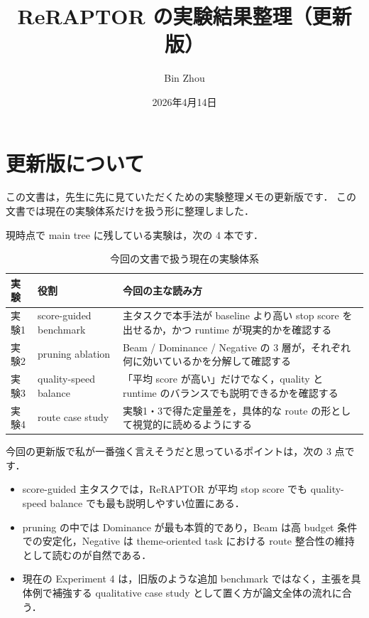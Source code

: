 \documentclass[a4paper,11pt]{article}
\newcommand{\reraptor}{ReRAPTOR}
\begin{document}
\sloppy

\title{ReRAPTOR の実験結果整理（更新版）}
\author{Bin Zhou}
\date{2026年4月14日}
\maketitle

\tableofcontents

\section{更新版について}
この文書は，先生に先に見ていただくための実験整理メモの更新版です．
この文書では現在の実験体系だけを扱う形に整理しました．

現時点で main tree に残している実験は，次の 4 本です．

\begin{table}[H]
    \centering
    \small
    \caption{今回の文書で扱う現在の実験体系}
    \begin{tabularx}{\linewidth}{L{1.4cm}L{4.0cm}X}
        \toprule
        実験 & 役割 & 今回の主な読み方 \\
        \midrule
        実験1 & score-guided benchmark & 主タスクで本手法が baseline より高い stop score を出せるか，かつ runtime が現実的かを確認する \\
        実験2 & pruning ablation & Beam / Dominance / Negative の 3 層が，それぞれ何に効いているかを分解して確認する \\
        実験3 & quality-speed balance & 「平均 score が高い」だけでなく，quality と runtime のバランスでも説明できるかを確認する \\
        実験4 & route case study & 実験1・3で得た定量差を，具体的な route の形として視覚的に読めるようにする \\
        \bottomrule
    \end{tabularx}
\end{table}

今回の更新版で私が一番強く言えそうだと思っているポイントは，次の 3 点です．
\begin{itemize}
    \item score-guided 主タスクでは，\reraptor{} が平均 stop score でも quality-speed balance でも最も説明しやすい位置にある．
    \item pruning の中では Dominance が最も本質的であり，Beam は高 budget 条件での安定化，Negative は theme-oriented task における route 整合性の維持として読むのが自然である．
    \item 現在の Experiment 4 は，旧版のような追加 benchmark ではなく，主張を具体例で補強する qualitative case study として置く方が論文全体の流れに合う．
\end{itemize}
\end{document}
